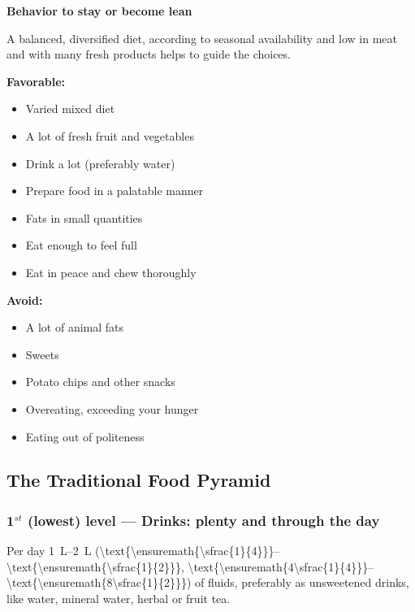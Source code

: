 \documentclass[../main.tex]{subfiles}
\begin{document}
\vspace{5mm}
\noindent
\begin{fminipage}{\textwidth}
  \textbf{Behavior to stay or become lean}
  
  A balanced, diversified diet, according to seasonal availability and low in meat and with many fresh products helps to guide the choices.

  \textbf{Favorable:}
  \begin{itemize}[noitemsep,nolistsep]
  \item Varied mixed diet
  \item A lot of fresh fruit and vegetables
  \item Drink a lot (preferably water)
  \item Prepare food in a palatable manner
  \item Fats in small quantities
  \item Eat enough to feel full
  \item Eat in peace and chew thoroughly   
  \end{itemize}
  
  \textbf{Avoid:}
  \begin{itemize}[noitemsep,nolistsep]
  \item A lot of animal fats
  \item Sweets
  \item Potato chips and other snacks
  \item Overeating, exceeding your hunger
    \item Eating out of politeness
  \end{itemize}
  
\end{fminipage}

\subsection{The Traditional Food Pyramid}

\subsubsection{1$^{st}$ (lowest) level --- Drinks: plenty and through the day}

Per day \SIrange{1}{2}{\liter}
(\SIrange[parse-numbers=false]{\text{\ensuremath{\sfrac{1}{4}}}}{\text{\ensuremath{\sfrac{1}{2}}}}{\ga},
\SIrange[parse-numbers=false]{\text{\ensuremath{4\sfrac{1}{4}}}}{\text{\ensuremath{8\sfrac{1}{2}}}}{\cup})
of fluids, preferably as unsweetened drinks, like water, mineral water, herbal or fruit tea.
\end{document}
